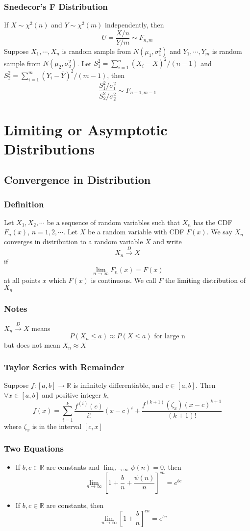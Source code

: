 \documentclass[11pt]{article}
\newcommand{\R}{{\mathbb{R}}}
\begin{document}
\subsubsection{Snedecor's F Distribution}
If $X\sim\chi^2(n)$ and $Y\sim\chi^2(m)$ independently, then
\[U=\frac{X/n}{Y/m}\sim F_{n,m}\]
Suppose $X_1,\cdots,X_n$ is random sample from $N(\mu_1,\sigma_1^2)$ and $Y_1,\cdots,Y_m$ is random sample from $N(\mu_2,\sigma_2^2)$. 
Let $S_1^2 = \sum_{i=1}^{n}(X_i-\overline{X})^2/(n-1)$ and $S_2^2 = \sum_{i=1}^{m}(Y_i-\overline{Y})^2/(m-1)$, then
\[\frac{S_1^2/\sigma_1^2}{S_2^2/\sigma_2^2}\sim F_{n-1,m-1}\]

\section{Limiting or Asymptotic Distributions}
\subsection{Convergence in Distribution}
\subsubsection{Definition}
Let $X_1,X_2,\cdots$ be a sequence of random variables such that $X_n$ has the CDF $F_n(x)$, $n=1,2,\cdots$. Let 
$X$ be a random variable with CDF $F(x)$. We say $X_n$ converges in distribution to a random variable $X$ and write 
\[X_n\overset{D}{\rightarrow}X\]
if \[\lim_{n\to\infty}F_n(x) = F(x)\]
at all points $x$ which $F(x)$ is continuous. We call $F$ the limiting distribution of $X_n$
\subsubsection*{Notes}
$X_n\overset{D}{\rightarrow}X$ means \[P(X_n\leq a)\approx P(X\leq a)\text{ for large n}\]
but does not mean $X_n\approx X$
\subsubsection{Taylor Series with Remainder}
Suppose $f:[a,b]\rightarrow\R$ is infinitely differentiable, and $c\in[a,b]$. Then $\forall x\in[a,b]$ and 
positive integer $k$, 
\[f(x) = \sum_{i=1}^{k}\frac{f^{(i)}(c)}{i!}(x-c)^i + \frac{f^{(k+1)}(\zeta_x)(x-c)^{k+1}}{(k+1)!}\]
where $\zeta_x$ is in the interval $[c,x]$
\subsubsection*{Two Equations}
\begin{itemize}
    \item If $b,c\in\R$ are constants and $\lim_{n\to\infty}\psi(n)=0$, then \[\lim_{n\to\infty}\left[1+\frac{b}{n}+\frac{\psi(n)}{n}\right]^{cn}=e^{bc}\]
    \item If $b,c\in\R$ are constants, then \[\lim_{n\to\infty}\left[1+\frac{b}{n}\right]^{cn}=e^{bc}\]
\end{itemize}
\end{document}
